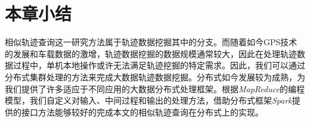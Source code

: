 \section{本章小结}
\label{sec:distributed-conclusion}
相似轨迹查询这一研究方法属于轨迹数据挖掘其中的分支。而随着如今GPS技术的发展和车载数据的激增，轨迹数据挖掘的数据规模通常较大，因此在处理轨迹数据过程中，单机本地操作或许无法满足轨迹挖掘的特定需求。因此，我们可以通过分布式集群处理的方法来完成大数据轨迹数据挖掘。分布式如今发展较为成熟，为我们提供了许多适应于不同应用的大数据分布式处理框架。根据\emph{MapReduce}的编程模型，我们自定义对输入、中间过程和输出的处理方法，借助分布式框架\emph{Spark}提供的接口方法能够较好的完成本文的相似轨迹查询在分布式上的实现。